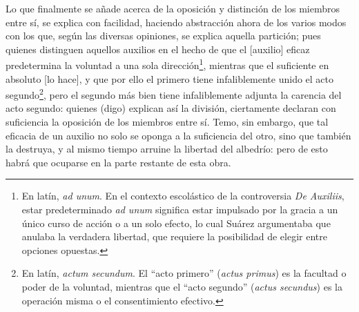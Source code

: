 \documentclass{article}
\begin{document}
Lo que finalmente se a\~{n}ade acerca de la oposici\'{o}n y distinci\'{o}n de los
miembros entre s\'{i}, se explica con facilidad, haciendo abstracci\'{o}n ahora de los
varios modos con los que, seg\'{u}n las diversas opiniones, se explica aquella
partici\'{o}n; pues quienes distinguen aquellos auxilios en el hecho de que el [auxilio]
eficaz predetermina la voluntad a una sola direcci\'{o}n\footnote{En lat\'{i}n,
\textit{ad unum}. En el contexto escol\'{a}stico de la controversia \textit{De
Auxiliis}, estar predeterminado \textit{ad unum} significa estar impulsado por la gracia
a un \'{u}nico curso de acci\'{o}n o a un solo efecto, lo cual Suárez argumentaba que
anulaba la verdadera libertad, que requiere la posibilidad de elegir entre opciones
opuestas.}, mientras que el suficiente en absoluto [lo hace], y que por ello el primero
tiene infaliblemente unido el acto segundo\footnote{En lat\'{i}n, \textit{actum
secundum}. El \enquote{acto primero} (\textit{actus primus}) es la facultad o poder de
la voluntad, mientras que el \enquote{acto segundo} (\textit{actus secundus}) es la
operaci\'{o}n misma o el consentimiento efectivo.}, pero el segundo m\'{a}s bien tiene
infaliblemente adjunta la carencia del acto segundo: quienes (digo) explican as\'{i} la
divisi\'{o}n, ciertamente declaran con suficiencia la oposici\'{o}n de los miembros
entre s\'{i}. Temo, sin embargo, que tal eficacia de un auxilio no solo se oponga a la
suficiencia del otro, sino que tambi\'{e}n la destruya, y al mismo tiempo arruine la
libertad del albedr\'{i}o: pero de esto habr\'{a} que ocuparse en la parte restante de
esta obra.
\end{document}
